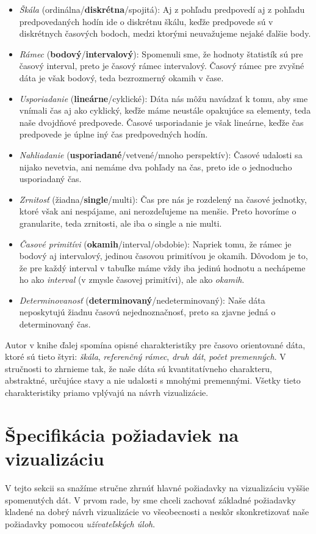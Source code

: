 \begin{itemize}
	\item \textit{Škála} (ordinálna/\textbf{diskrétna}/spojitá): Aj z pohľadu predpovedí aj z pohľadu predpovedaných hodín ide o diskrétnu škálu, keďže predpovede sú v diskrétnych časových bodoch, medzi ktorými neuvažujeme nejaké ďalšie body.
	\item \textit{Rámec} (\textbf{bodový}/\textbf{intervalový}): Spomenuli sme, že hodnoty štatistík sú pre časový interval, preto je časový rámec intervalový. Časový rámec pre zvyšné dáta je však bodový, teda bezrozmerný okamih v čase. 
	\item \textit{Usporiadanie} (\textbf{lineárne}/cyklické): Dáta nás môžu navádzať k tomu, aby sme vnímali čas aj ako cyklický, keďže máme neustále opakujúce sa elementy, teda naše dvojdňové predpovede. Časové usporiadanie je však lineárne, keďže čas predpovede je úplne iný čas predpovedných hodín.
	\item \textit{Nahliadanie} (\textbf{usporiadané}/vetvené/mnoho perspektív): Časové udalosti sa nijako nevetvia, ani nemáme dva pohľady na čas, preto ide o jednoducho usporiadaný čas.
	\item \textit{Zrnitosť} (žiadna/\textbf{single}/multi): Čas pre nás je rozdelený na časové jednotky, ktoré však ani nespájame, ani nerozdeľujeme na menšie. Preto hovoríme o granularite, teda zrnitosti, ale iba o single a nie multi.
	\item \textit{Časové primitívi} (\textbf{okamih}/interval/obdobie): Napriek tomu, že rámec je bodový aj intervalový, jedinou časovou primitívou je okamih. Dôvodom je to, že pre každý interval v tabuľke máme vždy iba jedinú hodnotu a nechápeme ho ako \textit{interval} (v zmysle časovej primitívi), ale ako \textit{okamih}.
	\item \textit{Determinovanosť} (\textbf{determinovaný}/nedeterminovaný): Naše dáta neposkytujú žiadnu časovú nejednoznačnosť, preto sa zjavne jedná o determinovaný čas.
\end{itemize}

Autor v knihe ďalej spomína opisné charakteristiky pre časovo orientované dáta, ktoré sú tieto štyri: \textit{škála}, \textit{referenčný rámec}, \textit{druh dát}, \textit{počet premenných}. V stručnosti to zhrnieme tak, že naše dáta sú kvantitatívneho charakteru, abstraktné, určujúce stavy a nie udalosti s mnohými premennými. Všetky tieto charakteristiky priamo vplývajú na návrh vizualizácie. 

\section{Špecifikácia požiadaviek na vizualizáciu}
V tejto sekcii sa snažíme stručne zhrnúť hlavné požiadavky na vizualizáciu vyššie spomenutých dát. V prvom rade, by sme chceli zachovať základné požiadavky kladené na dobrý návrh vizualizácie vo všeobecnosti a neskôr skonkretizovať naše požiadavky pomocou \textit{užívateľských úloh}.

